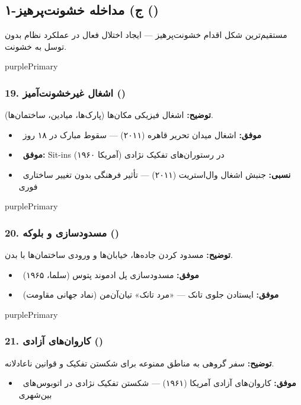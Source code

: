 \documentclass[a4paper,12pt]{article}
\newcommand{\success}[1]{\textcolor{greenPrimary}{\faCheckCircle\ \textbf{موفق:}} #1}
\newcommand{\partialresult}[1]{\textcolor{yellowPrimary}{\faExclamationTriangle\ \textbf{نسبی:}} #1}
\newcommand{\methodnum}[1]{\textcolor{purpleLight}{\textbf{#1.}}}
\begin{document}
\subsection{\textcolor{purplePrimary}{\faCircle[regular]} ۱-ج) مداخله خشونت‌پرهیز ()}

مستقیم‌ترین شکل اقدام خشونت‌پرهیز — ایجاد اختلال فعال در عملکرد نظام بدون توسل به خشونت.

\begin{methodcard}{purplePrimary}
\subsubsection{\methodnum{19} اشغال غیرخشونت‌آمیز ()}
\textbf{توضیح:} اشغال فیزیکی مکان‌ها (پارک‌ها، میادین، ساختمان‌ها).

\begin{itemize}[label=\textcolor{greenPrimary}{\faCheckCircle}]
  \item \success{اشغال میدان تحریر قاهره (۲۰۱۱) — سقوط مبارک در ۱۸ روز}
  \item \success{Sit-ins در رستوران‌های تفکیک نژادی (آمریکا ۱۹۶۰)}
\end{itemize}
\begin{itemize}[label=\textcolor{yellowPrimary}{\faExclamationTriangle}]
  \item \partialresult{جنبش اشغال وال‌استریت (۲۰۱۱) — تأثیر فرهنگی بدون تغییر ساختاری فوری}
\end{itemize}
\end{methodcard}

\begin{methodcard}{purplePrimary}
\subsubsection{\methodnum{20} مسدودسازی و بلوکه ()}
\textbf{توضیح:} مسدود کردن جاده‌ها، خیابان‌ها و ورودی ساختمان‌ها با بدن.

\begin{itemize}[label=\textcolor{greenPrimary}{\faCheckCircle}]
  \item \success{مسدودسازی پل ادموند پتوس (سلما، ۱۹۶۵)}
  \item \success{ایستادن جلوی تانک — «مرد تانک» تیان‌آن‌من (نماد جهانی مقاومت)}
\end{itemize}
\end{methodcard}

\begin{methodcard}{purplePrimary}
\subsubsection{\methodnum{21} کاروان‌های آزادی ()}
\textbf{توضیح:} سفر گروهی به مناطق ممنوعه برای شکستن تفکیک و قوانین ناعادلانه.

\begin{itemize}[label=\textcolor{greenPrimary}{\faCheckCircle}]
  \item \success{کاروان‌های آزادی آمریکا (۱۹۶۱) — شکستن تفکیک نژادی در اتوبوس‌های بین‌شهری}
\end{itemize}
\end{methodcard}
\end{document}
